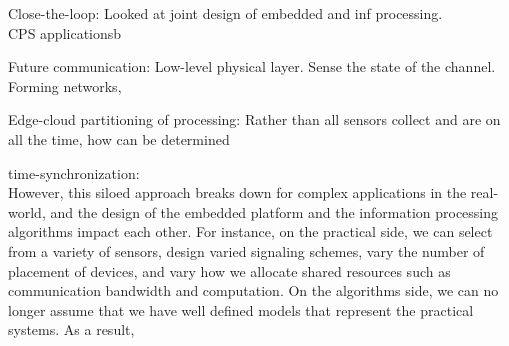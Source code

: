 \documentclass[10pt]{article}
\begin{document}
Close-the-loop:
Looked at joint design of embedded and inf processing.\\
CPS applicationsb

Future communication:
Low-level physical layer. Sense the state of the channel. \\
Forming networks, 

Edge-cloud partitioning of processing:
Rather than all sensors collect and are on all the time, how can be determined






time-synchronization:\\




However, this siloed approach breaks down for complex applications in the real-world, and the design of the embedded platform and the information processing algorithms impact each other. For instance, on the practical side, we can select from a variety of sensors, design varied signaling schemes, vary the number of placement of devices, and vary how we allocate shared resources such as communication bandwidth and computation. On the algorithms side, we can no longer assume that we have well defined models that represent the practical systems. As a result, 
\end{document}
